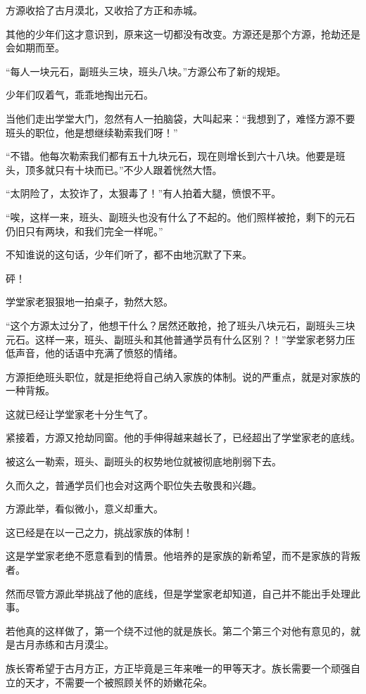 \begin{this_body}
方源收拾了古月漠北，又收拾了方正和赤城。

其他的少年们这才意识到，原来这一切都没有改变。方源还是那个方源，抢劫还是会如期而至。

“每人一块元石，副班头三块，班头八块。”方源公布了新的规矩。

少年们叹着气，乖乖地掏出元石。

当他们走出学堂大门，忽然有人一拍脑袋，大叫起来：“我想到了，难怪方源不要班头的职位，他是想继续勒索我们呀！”

“不错。他每次勒索我们都有五十九块元石，现在则增长到六十八块。他要是班头，顶多就只有十块而已。”不少人跟着恍然大悟。

“太阴险了，太狡诈了，太狠毒了！”有人拍着大腿，愤恨不平。

“唉，这样一来，班头、副班头也没有什么了不起的。他们照样被抢，剩下的元石仍旧只有两块，和我们完全一样呢。”

不知谁说的这句话，少年们听了，都不由地沉默了下来。

砰！

学堂家老狠狠地一拍桌子，勃然大怒。

“这个方源太过分了，他想干什么？居然还敢抢，抢了班头八块元石，副班头三块元石。这样一来，班头、副班头和其他普通学员有什么区别？！”学堂家老努力压低声音，他的话语中充满了愤怒的情绪。

方源拒绝班头职位，就是拒绝将自己纳入家族的体制。说的严重点，就是对家族的一种背叛。

这就已经让学堂家老十分生气了。

紧接着，方源又抢劫同窗。他的手伸得越来越长了，已经超出了学堂家老的底线。

被这么一勒索，班头、副班头的权势地位就被彻底地削弱下去。

久而久之，普通学员们也会对这两个职位失去敬畏和兴趣。

方源此举，看似微小，意义却重大。

这已经是在以一己之力，挑战家族的体制！

这是学堂家老绝不愿意看到的情景。他培养的是家族的新希望，而不是家族的背叛者。

然而尽管方源此举挑战了他的底线，但是学堂家老却知道，自己并不能出手处理此事。

若他真的这样做了，第一个绕不过他的就是族长。第二个第三个对他有意见的，就是古月赤练和古月漠尘。

族长寄希望于古月方正，方正毕竟是三年来唯一的甲等天才。族长需要一个顽强自立的天才，不需要一个被照顾关怀的娇嫩花朵。


\end{this_body}
